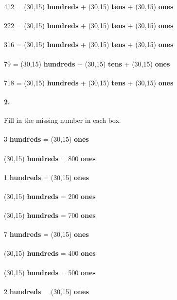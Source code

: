 \documentclass[12pt]{article}
\begin{document}
412 = \framebox(30,15){} \textbf{hundreds} + \framebox(30,15){} \textbf{tens} + \framebox(30,15){} \textbf{ones}
\\
\\
222 = \framebox(30,15){} \textbf{hundreds} + \framebox(30,15){} \textbf{tens} + \framebox(30,15){} \textbf{ones}
\\
\\
316 = \framebox(30,15){} \textbf{hundreds} + \framebox(30,15){} \textbf{tens} + \framebox(30,15){} \textbf{ones}
\\
\\
79 = \framebox(30,15){} \textbf{hundreds} + \framebox(30,15){} \textbf{tens} + \framebox(30,15){} \textbf{ones}
\\
\\
718 = \framebox(30,15){} \textbf{hundreds} + \framebox(30,15){} \textbf{tens} + \framebox(30,15){} \textbf{ones}

\bigskip
\bigskip
\bigskip
\newpage

\paragraph{2.}
Fill in the missing number in each box. \\
\\
3 \textbf{hundreds} = \framebox(30,15){} \textbf{ones}
\\
\\
\framebox(30,15){} \textbf{hundreds} = 800 \textbf{ones}
\\
\\
1 \textbf{hundreds} = \framebox(30,15){} \textbf{ones}
\\
\\
\framebox(30,15){} \textbf{hundreds} = 200 \textbf{ones}
\\
\\
\framebox(30,15){} \textbf{hundreds} = 700 \textbf{ones}
\\
\\
7 \textbf{hundreds} = \framebox(30,15){} \textbf{ones}
\\
\\
\framebox(30,15){} \textbf{hundreds} = 400 \textbf{ones}
\\
\\
\framebox(30,15){} \textbf{hundreds} = 500 \textbf{ones}
\\
\\
2 \textbf{hundreds} = \framebox(30,15){} \textbf{ones}

\bigskip
\bigskip
\bigskip
\newpage
\end{document}
